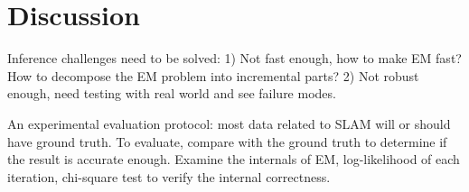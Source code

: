 \section{Discussion}

Inference challenges need to be solved: 1) Not fast enough, how to make EM fast? How to decompose the EM problem into incremental parts? 2) Not robust enough, need testing with real world and see failure modes.

An experimental evaluation protocol: most data related to SLAM will or should have ground truth. To evaluate, compare with the ground truth to determine if  the result is accurate enough. Examine the internals of EM, log-likelihood of each iteration, chi-square test to verify the internal correctness.
